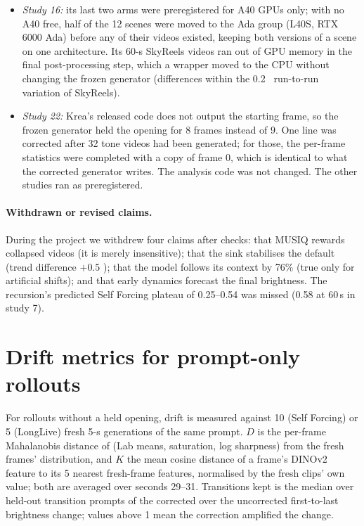 \begin{itemize}
pairing is unaffected.
\item \emph{Study 16:} its last two arms were preregistered for A40 GPUs only; with no A40 free, half of the 12 scenes
were moved to the Ada group (L40S, RTX 6000 Ada) before any of their videos existed, keeping both versions of a scene on
one architecture. Its 60-s SkyReels videos ran out of GPU memory in the final post-processing step, which a wrapper moved
to the CPU without changing the frozen generator (differences within the 0.2~\Lstar{} run-to-run variation of SkyReels).
\item \emph{Study 22:} Krea's released code does not output the starting frame, so the frozen generator held the opening
for 8 frames instead of 9. One line was corrected after 32 tone videos had been generated; for those, the per-frame
statistics were completed with a copy of frame 0, which is identical to what the corrected generator writes. The
analysis code was not changed. The other studies ran as preregistered.
\end{itemize}

\paragraph{Withdrawn or revised claims.} During the project we withdrew four claims after checks: that MUSIQ rewards
collapsed videos (it is merely insensitive); that the sink stabilises the default (trend difference $+0.5$
); that the model follows its context by 76\% (true only for artificial shifts); and that early dynamics
forecast the final brightness. The recursion's predicted Self Forcing plateau of 0.25--0.54 was missed (0.58 at 60\,s in study 7).

\section{Drift metrics for prompt-only rollouts}\label{app:metrics}
For rollouts without a held opening, drift is measured against 10 (Self Forcing) or 5 (LongLive) fresh 5-s generations
of the same prompt. $D$ is the per-frame Mahalanobis distance of (Lab means, saturation, log sharpness) from the fresh
frames' distribution, and $K$ the mean cosine distance of a frame's DINOv2 feature to its 5 nearest fresh-frame
features, normalised by the fresh clips' own value; both are averaged over seconds 29--31. Transitions kept is the
median over held-out transition prompts of the corrected over the uncorrected first-to-last brightness change; values
above 1 mean the correction amplified the change.

